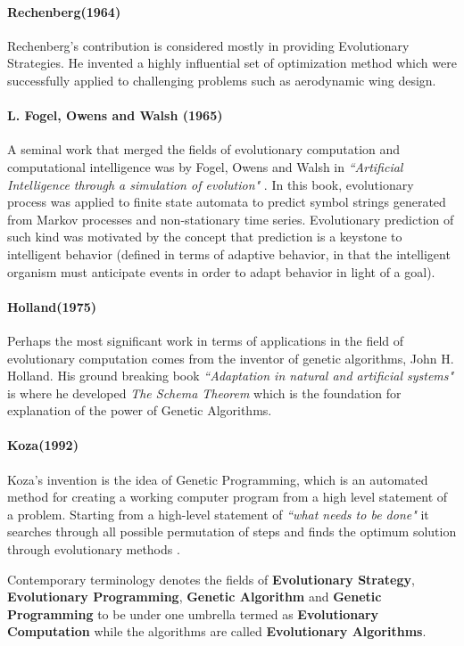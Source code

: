 \paragraph{Rechenberg(1964)}
Rechenberg's contribution is considered mostly in providing Evolutionary Strategies. He invented a highly influential set of optimization method which were successfully applied to challenging problems such as aerodynamic wing design. \cite{rechenberg1973}

\paragraph{L. Fogel, Owens and Walsh (1965)}
A seminal work that merged the fields of evolutionary computation and computational intelligence was by Fogel, Owens and Walsh in \textsl{``Artificial Intelligence through a simulation of evolution"} \cite{fogel1966}. In this book, evolutionary process was applied to finite state automata to predict symbol strings generated from Markov processes and non-stationary time series. Evolutionary prediction of such kind was motivated by the concept that prediction is a keystone to intelligent behavior (defined in terms of adaptive behavior, in that the intelligent organism must anticipate events in order to adapt behavior in light of a goal). 

\paragraph{Holland(1975)}
Perhaps the most significant work in terms of applications in the field of evolutionary computation comes from the inventor of genetic algorithms, John H. Holland. His ground breaking book \textsl{``Adaptation in natural and artificial systems"} \cite{holland1975} is where he developed \textit{The Schema Theorem} which is the foundation for explanation of the power of Genetic Algorithms.

\paragraph{Koza(1992)}
Koza's invention is the idea of Genetic Programming, which is an automated method for creating a working computer program from a high level statement of a problem. Starting from a high-level statement of \textsl{``what needs to be done"} it searches through all possible permutation of steps and finds the optimum solution through evolutionary methods \cite{koza1992}.

Contemporary terminology denotes the fields of \textbf{Evolutionary Strategy}, \textbf{Evolutionary Programming}, \textbf{Genetic Algorithm} and \textbf{Genetic Programming} to be under one umbrella termed as \textbf{Evolutionary Computation} while the algorithms are called \textbf{Evolutionary Algorithms}.

